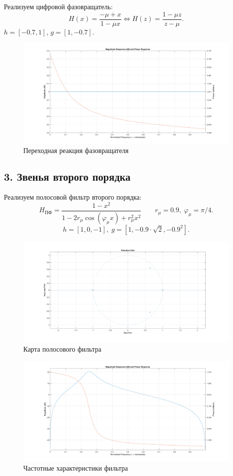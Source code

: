 \documentclass[12pt,a4paper]{article}
\begin{document}
	Реализуем цифровой фазовращатель:
	$$ H(x) = \frac{-\mu + x}{1 - \mu x} \Leftrightarrow H(z) = \frac{1 - \mu z}{z - \mu}.$$
	$h = [-0.7, 1]$, $g = [1, -0.7]$.
	\begin{figure}[H]
		\centering
		\includegraphics[width=1.0\linewidth]{res/2_9_phaseshifter.png}
		\caption{Переходная реакция фазовращателя}
	\end{figure}
	
	\subsection*{3. Звенья второго порядка}
	Реализуем полосовой фильтр второго порядка:
	$$ H_{\text{ПФ}} = \frac{1 - x^2}{1 - 2 r_{\mu} \cos( \varphi_\mu x) + r_\mu^2 x^2}\qquad r_\mu = 0.9, \; \varphi_\mu = \pi / 4. $$
	$$h = [1, 0, -1], \; g = [1, -0.9 \cdot \sqrt{2}, -0.9^2].$$
	\begin{figure}[H]
		\centering
		\includegraphics[width=1.0\linewidth]{res/3_1_bandpass_poles.png}
		\caption{Карта полосового фильтра}
	\end{figure}
	
	\begin{figure}[H]
		\centering
		\includegraphics[width=1.0\linewidth]{res/3_1_bandpass.png}
		\caption{Частотные характеристики фильтра}
	\end{figure}
	
\end{document}
